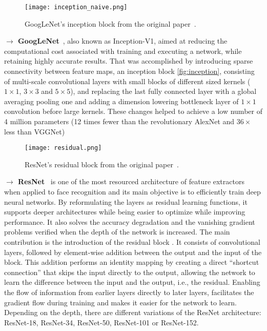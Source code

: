 \documentclass[class=report, crop=false, a4paper, 12pt]{standalone}
\begin{document}
\begin{figure}[H]
    \centering
    \texttt{[image: inception\_naive.png]}
    \caption[GoogLeNet's inception block.]{GoogLeNet's inception block from the original paper~\autocite{szegedyGoingDeeperConvolutions2014}.}
    \label{fig:inception}
\end{figure}

\noindent\textbf{$\rightarrow$ GoogLeNet}~\autocite{szegedyGoingDeeperConvolutions2014}, also known as Inception-V1, aimed at reducing the computational cost associated with training and executing a network, while retaining highly accurate results. That was accomplished by introducing sparse connectivity between feature maps, an inception block \autoref{fig:inception}, consisting of multi-scale convolutional layers with small blocks of different sized kernels ($1\times 1$, $3\times 3$ and $5\times 5$), and replacing the last fully connected layer with a global averaging pooling one and adding a dimension lowering bottleneck layer of $1\times 1$ convolution before large kernels. These changes helped to achieve a low number of 4 million parameters (12 times fewer than the revolutionary AlexNet and $36\times$ less than VGGNet)

\vspace{0.7\baselineskip}
\begin{figure}[H]
    \centering
    \texttt{[image: residual.png]}
    \caption[ResNet's residual block.]{ResNet's residual block from the original paper~\autocite{heDeepResidualLearning2016}.}
    \label{fig:residual}
\end{figure}

\vspace{0.7\baselineskip}
\label{sec:resnet}
\noindent\textbf{$\rightarrow$ ResNet}~\autocite{heDeepResidualLearning2016} is one of the most resourced architecture of feature extractors when applied to face recognition and its main objective is to efficiently train deep neural networks. By reformulating the layers as residual learning functions, it supports deeper architectures while being easier to optimize while improving performance. It also solves the accuracy degradation and the vanishing gradient problems verified when the depth of the network is increased. The main contribution is the introduction of the residual block . It consists of convolutional layers, followed by element-wise addition between the output and the input of the block. This addition performs an identity mapping by creating a direct ``shortcut connection'' that skips the input directly to the output, allowing the network to learn the difference between the input and the output, i.e., the residual. Enabling the flow of information from earlier layers directly to later layers, facilitates the gradient flow during training and makes it easier for the network to learn. Depending on the depth, there are different variations of the ResNet architecture: ResNet-18, ResNet-34, ResNet-50, ResNet-101 or ResNet-152.
\end{document}
